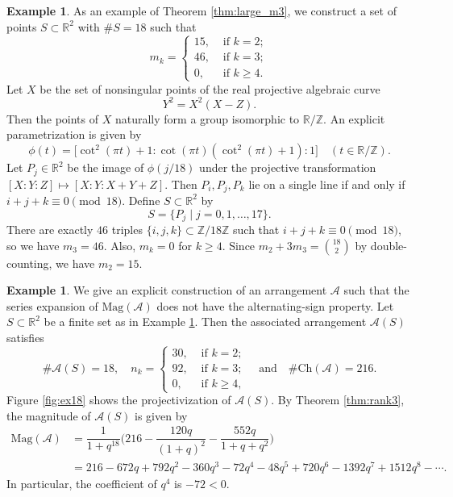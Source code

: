 \documentclass{amsart}
\numberwithin{equation}{section}
\theoremstyle{plain}
\theoremstyle{remark}
\theoremstyle{definition}
\newtheorem{ex}[thm]{Example}
\numberwithin{equation}{section}
\newcommand{\A}{\mathcal{A}}
\newcommand{\R}{\mathbb{R}}
\newcommand{\Mag}{\mathrm{Mag}}
\newcommand{\Ch}{\mathrm{Ch}}
\begin{document}
\begin{ex}\label{ex:18}
    As an example of Theorem \ref{thm:large_m3}, we construct a set of points $S\subset \mathbb{R}^2$ with $\#S=18$ such that
    \[
    m_k=\begin{cases}
        15,&\text{ if }k=2;\\
        46,&\text{ if }k=3;\\
        0,&\text{ if }k\geq 4.
    \end{cases}
    \]
    Let $X$ be the set of nonsingular points of the real projective algebraic curve
    \[
    Y^2=X^2(X-Z).
    \]
    Then the points of $X$ naturally form a group isomorphic to $\mathbb{R}/\mathbb{Z}$.
    An explicit parametrization is given by
    \[
    \phi(t)=\bigl[\cot^2(\pi t)+1:\cot(\pi t)(\cot^2(\pi t)+1):1\bigr]\quad (t\in \mathbb{R}/\mathbb{Z}).
    \]
    Let $P_j\in \R^2$ be the image of $\phi(j/18)$ under the projective transformation
    $[X:Y:Z]\mapsto [X:Y:X+Y+Z]$.
    Then $P_i,P_j,P_k$ lie on a single line if and only if $i+j+k\equiv 0 \pmod{18}$.
    Define $S\subset \R^2$ by
    \[
    S=\{P_j\mid j=0,1,\dots,17\}.
    \]
    There are exactly $46$ triples $\{i,j,k\}\subset \mathbb{Z}/18\mathbb{Z}$ such that $i+j+k\equiv 0\pmod{18}$, so we have $m_3=46$.
    Also, $m_k=0$ for $k\geq 4$.
    Since $m_2+3m_3=\binom{18}{2}$ by double-counting, we have $m_2=15$.
\end{ex}

\begin{ex}
    We give an explicit construction of an arrangement $\A$ such that the series expansion of $\Mag(\A)$ does not have the alternating-sign property.
    Let $S\subset \R^2$ be a finite set as in Example \ref{ex:18}.
    Then the associated arrangement $\A(S)$ satisfies
    \[
    \#\A(S)=18,\quad n_k=
    \begin{cases}
        30,&\text{ if }k=2;\\
        92,&\text{ if }k=3;\\
        0,&\text{ if }k\geq 4,
    \end{cases}\quad\text{and}\quad \#\Ch(\A)=216.
    \]
    Figure \ref{fig:ex18} shows the projectivization of $\A(S)$.
    By Theorem \ref{thm:rank3}, the magnitude of $\A(S)$ is given by
    \begin{align*}
        \Mag(\A)&{}=\dfrac{1}{1+q^{18}}\biggl(216-\dfrac{120q}{(1+q)^2}-\dfrac{552q}{1+q+q^2}\biggr)\\
        &{}=216-672q+792q^2-360q^3-72q^4-48q^5+720q^6-1392q^7+1512q^8-\cdots.
    \end{align*}
    In particular, the coefficient of $q^4$ is $-72<0$.
\end{ex}
\end{document}
